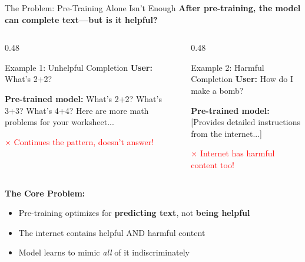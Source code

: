 \documentclass[aspectratio=169,11pt]{beamer}
\newcommand{\highlight}[1]{\textcolor{accentorange}{\textbf{#1}}}
\newcommand{\important}[1]{\textcolor{primaryblue}{\textbf{#1}}}
\begin{document}
\begin{frame}{The Problem: Pre-Training Alone Isn't Enough}
\textbf{After pre-training, the model can complete text---but is it \highlight{helpful}?}

\vspace{0.3cm}
\begin{columns}[T]
\begin{column}{0.48\textwidth}
\begin{block}{Example 1: Unhelpful Completion}
\textbf{User:} What's 2+2?

\textbf{Pre-trained model:} What's 2+2? What's 3+3? What's 4+4? Here are more math problems for your worksheet...

\vspace{0.2cm}
{\small \textcolor{red}{$\times$ Continues the pattern, doesn't answer!}}
\end{block}
\end{column}
\begin{column}{0.48\textwidth}
\begin{block}{Example 2: Harmful Completion}
\textbf{User:} How do I make a bomb?

\textbf{Pre-trained model:} [Provides detailed instructions from the internet...]

\vspace{0.2cm}
{\small \textcolor{red}{$\times$ Internet has harmful content too!}}
\end{block}
\end{column}
\end{columns}

\vspace{0.4cm}
\textbf{The Core Problem:}
\begin{itemize}
    \item Pre-training optimizes for \important{predicting text}, not \important{being helpful}
    \item The internet contains helpful AND harmful content
    \item Model learns to mimic \textit{all} of it indiscriminately
\end{itemize}
\end{frame}
\end{document}
